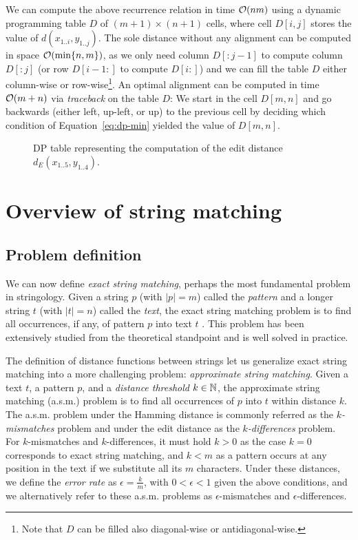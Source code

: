 We can compute the above recurrence relation in time $\mathcal{O}(nm)$ using a dynamic programming table $D$ of $(m+1) \times (n+1)$ cells, where cell $D[i,j]$ stores the value of $d(x_{1..i},y_{1..j})$.
The sole distance without any alignment can be computed in space $\mathcal{O}(\text{min}\{ n, m \})$, as we only need column $D[:j-1]$ to compute column $D[:j]$ (or row $D[i-1:]$ to compute $D[i:]$) and we can fill the table $D$ either column-wise or row-wise\footnote{Note that $D$ can be filled also diagonal-wise or antidiagonal-wise.}.
An optimal alignment can be computed in time $\mathcal{O}(m + n)$ via \emph{traceback} on the table $D$:
We start in the cell $D[m,n]$ and go backwards (either left, up-left, or up) to the previous cell by deciding which condition of Equation~\ref{eq:dp-min} yielded the value of $D[m,n]$.

\begin{figure}[h]
\begin{center}
\caption[Example of DP table.]{DP table representing the computation of the edit distance $d_E(x_{1..5}, y_{1..4})$.}
\label{fig:edit-dp}

\end{center}
\end{figure}



\section{Overview of string matching}

\subsection{Problem definition}

We can now define \emph{exact string matching}, perhaps the most fundamental problem in stringology.
Given a string $p$ (with $|p|=m$) called the \emph{pattern} and a longer string $t$ (with $|t|=n$) called the \emph{text}, the exact string matching problem is to find all occurrences, if any, of pattern $p$ into text $t$ \citep{Gusfield1997}.
This problem has been extensively studied from the theoretical standpoint and is well solved in practice.

The definition of distance functions between strings let us generalize exact string matching into a more challenging problem: \emph{approximate string matching}.
Given a text $t$, a pattern $p$, and a \emph{distance threshold} $k \in \mathbb {N}$, the approximate string matching (a.s.m.) problem is to find all occurrences of $p$ into $t$ within distance $k$.
The a.s.m. problem under the Hamming distance is commonly referred as the \emph{$k$-mismatches} problem and under the edit distance as the \emph{$k$-differences} problem.
For $k$-mismatches and $k$-differences, it must hold $k > 0$ as the case $k = 0$ corresponds to exact string matching, and $k < m$ as a pattern occurs at any position in the text if we substitute all its $m$ characters.
Under these distances, we define the \emph{error rate} as $\epsilon = \frac{k}{m}$, with $0 < \epsilon < 1$ given the above conditions, and we alternatively refer to these a.s.m. problems as $\epsilon$-mismatches and $\epsilon$-differences.

